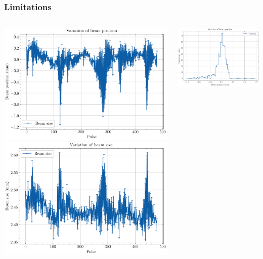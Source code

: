 \begin{frame}
  \frametitle{Limitations}
  \begin{columns}[T]
    \begin{column}{0.45\textwidth}
      \includegraphics[width=1\textwidth]{04_Test/fig/fig000_variation_a}
      \includegraphics[width=1\textwidth]{04_Test/fig/fig000_variation_b}
    \end{column}
    \begin{column}{0.45\textwidth}
      \includegraphics[width=1\textwidth]{04_Test/fig/fig000_hist_variation_a}

\end{column}
\end{columns}
\end{frame}
